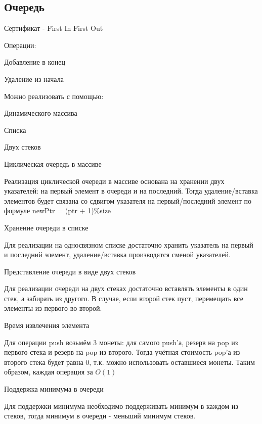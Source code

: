 \documentclass[a4paper,10pt]{article}
\begin{document}
	\subsection{Очередь}
		Сертификат - First In First Out \\
	\begin{center}
		Операции: \\
		\item Добавление в конец
		\item Удаление из начала
	\end{center}
	\begin{center}
		Можно реализовать с помощью: \\
		\item Динамического массива
		\item Списка
		\item Двух стеков
	\end{center}
	\begin{center}
		Циклическая очередь в массиве
	\end{center}
	Реализация циклической очереди в массиве основана на хранении двух указателей: на первый элемент в очереди и на последний. Тогда удаление/вставка элементов будет связана со сдвигом указателя на первый/последний элемент по формуле newPtr = (ptr + 1)\%size \\
	\begin{center}
		Хранение очереди в списке
	\end{center}
	Для реализации на односвязном списке достаточно хранить указатель на первый и последний элемент, удаление/вставка производятся сменой указателей. \\
	\begin{center}
		Представление очереди в виде двух стеков
	\end{center}
	Для реализации очереди на двух стеках достаточно вставлять элементы в один стек, а забирать из другого. В случае, если второй стек пуст, перемещать все элементы из первого во второй. \\
	\begin{center}
		Время извлечения элемента
	\end{center}
	Для операции push возьмём 3 монеты: для самого push'а, резерв на pop из первого стека и резерв на pop из второго. Тогда учётная стоимость pop'а из второго стека будет равна 0, т.к. можно использовать оставшиеся монеты. Таким образом, каждая операция за $O(1)$ \\
	\begin{center}
		Поддержка минимума в очереди
	\end{center}
	Для поддержки минимума необходимо поддерживать минимум в каждом из стеков, тогда минимум в очереди - меньший минимум стеков. \\
\end{document}
